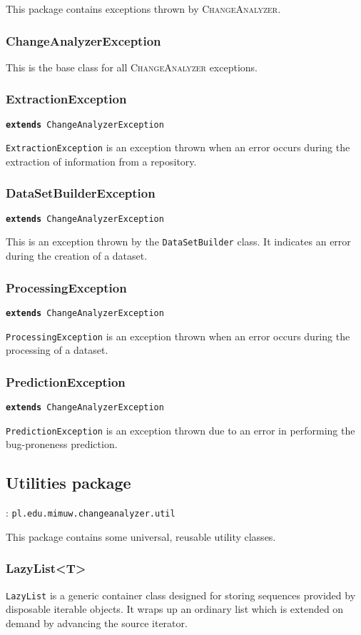\documentclass{pracamgr}
\newcommand{\ca}{\textsc{ChangeAnalyzer}\xspace}
\newcommand{\pack}[3]{\subsection{#1 package} \label{sec:#2} \underline{\smash{Full package name}}: \texttt{#3}\medskip}
\newcommand{\extends}[1]{\vspace{-0.5em}\hspace{\parindent}\texttt{\textbf{extends} #1}\vspace{0.5em}}
\begin{document}
\noindent This package contains exceptions thrown by \ca.

\subsubsection*{ChangeAnalyzerException}
This is the base class for all \ca exceptions.

\subsubsection*{ExtractionException}
\extends{ChangeAnalyzerException}

\noindent \texttt{ExtractionException} is an exception thrown when an error occurs during the extraction of information from a repository.

\subsubsection*{DataSetBuilderException}
\extends{ChangeAnalyzerException}

\noindent This is an exception thrown by the \texttt{DataSetBuilder} class. It indicates an error during the creation of a dataset.

\subsubsection*{ProcessingException}
\extends{ChangeAnalyzerException}

\noindent \texttt{ProcessingException} is an exception thrown when an error occurs during the processing of a dataset.

\subsubsection*{PredictionException}
\extends{ChangeAnalyzerException}

\noindent \texttt{PredictionException} is an exception thrown due to an error in performing the bug-proneness prediction.

\pack{Utilities}{utilities}{pl.edu.mimuw.changeanalyzer.util}

\noindent This package contains some universal, reusable utility classes.

\subsubsection*{LazyList<T>}
\texttt{LazyList} is a generic container class designed for storing sequences provided by disposable iterable objects. It wraps up an ordinary list which is extended on demand by advancing the source iterator.
\end{document}

